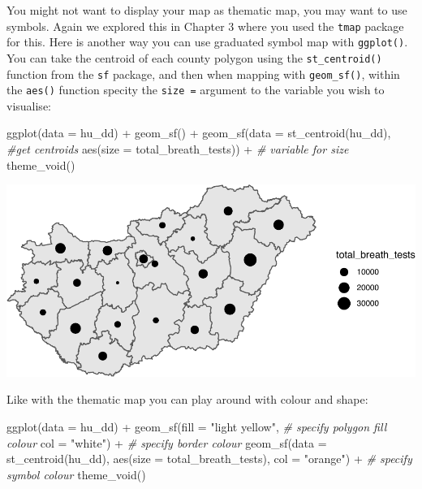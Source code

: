 \documentclass[
]{book}
\newenvironment{Shaded}{\begin{snugshade}}{\end{snugshade}}
\newcommand{\AttributeTok}[1]{\textcolor[rgb]{0.77,0.63,0.00}{#1}}
\newcommand{\CommentTok}[1]{\textcolor[rgb]{0.56,0.35,0.01}{\textit{#1}}}
\newcommand{\FunctionTok}[1]{\textcolor[rgb]{0.00,0.00,0.00}{#1}}
\newcommand{\NormalTok}[1]{#1}
\newcommand{\SpecialCharTok}[1]{\textcolor[rgb]{0.00,0.00,0.00}{#1}}
\newcommand{\StringTok}[1]{\textcolor[rgb]{0.31,0.60,0.02}{#1}}
\begin{document}
You might not want to display your map as thematic map, you may want to use symbols. Again we explored this in Chapter 3 where you used the \texttt{tmap} package for this. Here is another way you can use graduated symbol map with \texttt{ggplot()}. You can take the centroid of each county polygon using the \texttt{st\_centroid()} function from the \texttt{sf} package, and then when mapping with \texttt{geom\_sf()}, within the \texttt{aes()} function specity the \texttt{size\ =} argument to the variable you wish to visualise:

\begin{Shaded}
\begin{Highlighting}[]
\FunctionTok{ggplot}\NormalTok{(}\AttributeTok{data =}\NormalTok{ hu\_dd) }\SpecialCharTok{+} 
  \FunctionTok{geom\_sf}\NormalTok{() }\SpecialCharTok{+} 
  \FunctionTok{geom\_sf}\NormalTok{(}\AttributeTok{data =} \FunctionTok{st\_centroid}\NormalTok{(hu\_dd),  }\CommentTok{\#get centroids}
          \FunctionTok{aes}\NormalTok{(}\AttributeTok{size =}\NormalTok{ total\_breath\_tests)) }\SpecialCharTok{+}  \CommentTok{\# variable for size}
  \FunctionTok{theme\_void}\NormalTok{()}
\end{Highlighting}
\end{Shaded}

\includegraphics{crime_mapping_files/figure-latex/gradsymbmap-1.pdf}

Like with the thematic map you can play around with colour and shape:

\begin{Shaded}
\begin{Highlighting}[]
\FunctionTok{ggplot}\NormalTok{(}\AttributeTok{data =}\NormalTok{ hu\_dd) }\SpecialCharTok{+} 
  \FunctionTok{geom\_sf}\NormalTok{(}\AttributeTok{fill =} \StringTok{"light yellow"}\NormalTok{,   }\CommentTok{\# specify polygon fill colour}
          \AttributeTok{col =} \StringTok{"white"}\NormalTok{) }\SpecialCharTok{+}    \CommentTok{\# specify border colour}
  \FunctionTok{geom\_sf}\NormalTok{(}\AttributeTok{data =} \FunctionTok{st\_centroid}\NormalTok{(hu\_dd), }
          \FunctionTok{aes}\NormalTok{(}\AttributeTok{size =}\NormalTok{ total\_breath\_tests), }
          \AttributeTok{col =} \StringTok{"orange"}\NormalTok{) }\SpecialCharTok{+}  \CommentTok{\# specify symbol colour}
  \FunctionTok{theme\_void}\NormalTok{()}
\end{Highlighting}
\end{Shaded}
\end{document}
